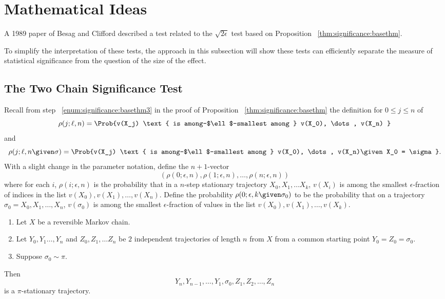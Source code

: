\documentclass[12pt]{article}
\begin{document}
\section*{Mathematical Ideas}

A 1989 paper of Besag and Clifford
\cite{besag89} described a test related to the \( \sqrt{2\epsilon} \)
test based on Proposition~%
\ref{thm:significance:basethm}.

To simplify the interpretation of these tests, the approach in this
subsection will show these tests can efficiently separate the measure of
statistical significance from the question of the size of the effect.

\subsection*{The Two Chain Significance Test}

Recall from step~%
\ref{enum:significance:basethm3} in the proof of Proposition~%
\ref{thm:significance:basethm} the definition for \( 0 \le j \le n \) of
\[
    \rho(j; \ell, n) = \Prob{v(X_j) \text{ is among-$\ell$-smallest
    among } v(X_0), \dots, v(X_n) }
\] and
\[
  \rho(j; \ell, n \given \sigma) = \Prob{v(X_j) \text{ is
      among-$\ell$-smallest among } v(X_0), \dots, v(X_n)%
    \given X_0 = \sigma}.
\] With a slight change in the parameter notation, define the \( n+1 \)-vector
\[
    (\rho(0; \epsilon, n), \rho(1; \epsilon, n), \dots, \rho(n; \epsilon,
    n))
\] where for each \( i \), \( \rho(i; \epsilon, n) \) is the probability
that in a \( n \)-step stationary trajectory \( X_0, X_1, \dots X_k \), \(
v(X_i) \) is among the smallest \( \epsilon \)-fraction of indices in
the list \( v(X_0), v(X_1), \dots, v(X_n) \).  Define the probability \(
\rho(0; \epsilon, k \given \sigma_0) \) to be the probability that on a
trajectory \( \sigma_0 = X_0, X_1, \dots, X_n \), \( v(\sigma_0) \) is
among the smallest \( \epsilon \)-fraction of values in the list \( v(X_0),
v(X_1), \dots, v(X_k) \).

\begin{lemma}
    \begin{enumerate}
        \item
            Let \( X \) be a reversible Markov chain.
        \item
            Let \( Y_0, Y_1 \dots, Y_n \) and \( Z_0, Z_1, \dots Z_n \)
            be \( 2 \) independent trajectories of length \( n \) from \(
            X \) from a common starting point \( Y_0 = Z_0 = \sigma_0 \).
        \item
            Suppose \( \sigma_0 \sim \pi \).
    \end{enumerate}
    Then
    \[
        Y_n, Y_{n-1}, \dots, Y_1, \sigma_0, Z_1, Z_2, \dots, Z_n
    \] is a \( \pi \)-stationary trajectory.
\end{lemma}
\end{document}
